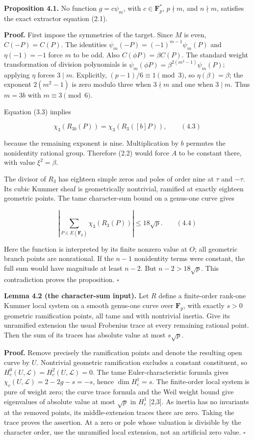 \documentclass[
  11pt,
  a4paper,
]{article}
\begin{document}
\textbf{Proposition 4.1.} No function \(g=c\psi_m\), with
\(c\in\mathbf F_p^*\), \(p\nmid m\), and \(n\nmid m\), satisfies the
exact extractor equation (2.1).

\textbf{Proof.} First impose the symmetries of the target. Since \(M\)
is even, \(C(-P)=C(P)\). The identities
\(\psi_m(-P)=(-1)^{m-1}\psi_m(P)\) and \(\eta(-1)=-1\) force \(m\) to be
odd. Also \(C(\phi P)=\beta C(P)\). The standard weight transformation
of division polynomials is \(\psi_m(\phi P)=\beta^{2(m^2-1)}\psi_m(P)\);
applying \(\eta\) forces \(3\mid m\). Explicitly,
\((p-1)/6\equiv1\pmod3\), so \(\eta(\beta)=\beta\); the exponent
\(2(m^2-1)\) is zero modulo three when \(3\nmid m\) and one when
\(3\mid m\). Thus \(m=3b\) with \(m\equiv3\pmod6\).

Equation (3.3) implies

\[
\chi_3(R_{3b}(P))=\chi_3(R_3([b]P)), \qquad (4.3)
\]

because the remaining exponent is nine. Multiplication by \(b\) permutes
the nonidentity rational group. Therefore (2.2) would force \(A\) to be
constant there, with value \(\xi^2=\beta\).

The divisor of \(R_3\) has eighteen simple zeros and poles of order nine
at \(\tau\) and \(-\tau\). Its cubic Kummer sheaf is geometrically
nontrivial, ramified at exactly eighteen geometric points. The tame
character-sum bound on a genus-one curve gives

\[
\left|\sum_{P\in E(\mathbf F_p)}\chi_3(R_3(P))\right|\leq18\sqrt p. \qquad (4.4)
\]

Here the function is interpreted by its finite nonzero value at \(O\);
all geometric branch points are nonrational. If the \(n-1\) nonidentity
terms were constant, the full sum would have magnitude at least \(n-2\).
But \(n-2>18\sqrt p\). This contradiction proves the proposition.
\(\square\)

\textbf{Lemma 4.2 (the character-sum input).} Let \(R\) define a
finite-order rank-one Kummer local system on a smooth genus-one curve
over \(\mathbf F_p\), with exactly \(s>0\) geometric ramification
points, all tame and with nontrivial inertia. Give its unramified
extension the usual Frobenius trace at every remaining rational point.
Then the sum of its traces has absolute value at most \(s\sqrt p\).

\textbf{Proof.} Remove precisely the ramification points and denote the
resulting open curve by \(U\). Nontrivial geometric ramification
excludes a constant constituent, so
\(H_c^0(U,\mathcal L)=H_c^2(U,\mathcal L)=0\). The tame
Euler-characteristic formula gives \(\chi_c(U,\mathcal L)=2-2g-s=-s\),
hence \(\dim H_c^1=s\). The finite-order local system is pure of weight
zero; the curve trace formula and the Weil weight bound give eigenvalues
of absolute value at most \(\sqrt p\) in \(H_c^1\) {[}2,3{]}. As inertia
has no invariants at the removed points, its middle-extension traces
there are zero. Taking the trace proves the assertion. At a zero or pole
whose valuation is divisible by the character order, use the unramified
local extension, not an artificial zero value. \(\square\)
\end{document}
